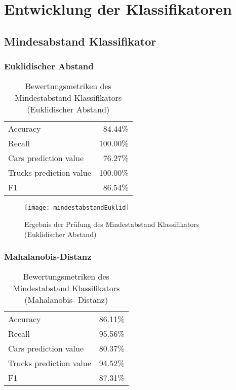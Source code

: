\chapter{Entwicklung der Klassifikatoren}

\section{Mindesabstand Klassifikator}

\subsection{Euklidischer Abstand}

\begin{table}[ht]
\centering
\begin{tabular}{| l | r |}
    \hline
    Accuracy                & 84.44\% \\
    Recall                  & 100.00\% \\
    Cars prediction value   & 76.27\% \\
    Trucks prediction value & 100.00\% \\
    F1                      & 86.54\% \\
    \hline
\end{tabular}
\caption{Bewertungsmetriken des Mindestabstand Klassifikators (Euklidischer
Abstand)}
\label{tab:euklid}
\end{table}

\begin{figure}[ht]
\centering
\texttt{[image: mindestabstandEuklid]}
\caption{Ergebnis der Pr\"ufung des Mindestabstand Klassifikators (Euklidischer
Abstand)}
\label{fig:euklid}
\end{figure}

\subsection{Mahalanobis-Distanz}

\begin{table}[ht]
\centering
\begin{tabular}{| l | r |}
    \hline
    Accuracy                & 86.11\% \\
    Recall                  & 95.56\% \\
    Cars prediction value   & 80.37\% \\
    Trucks prediction value & 94.52\% \\
    F1                      & 87.31\% \\
    \hline
\end{tabular}
\caption{Bewertungsmetriken des Mindestabstand Klassifikators (Mahalanobis-%
Distanz)}
\label{tab:mahalanobis}
\end{table}

